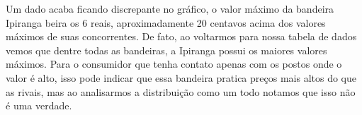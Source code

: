 \documentclass[12pt]{article}
\begin{document}
Um dado acaba ficando discrepante no gráfico, o valor máximo da bandeira Ipiranga beira os 6 reais, aproximadamente 20 centavos acima dos valores máximos de suas concorrentes. De fato, ao voltarmos para nossa tabela de dados vemos que dentre todas as bandeiras, a Ipiranga possui os maiores valores máximos. Para o consumidor que tenha contato apenas com os postos onde o valor é alto, isso pode indicar que essa bandeira pratica preços mais altos do que as rivais, mas ao analisarmos a distribuição como um todo notamos que isso não é uma verdade.
\end{document}
